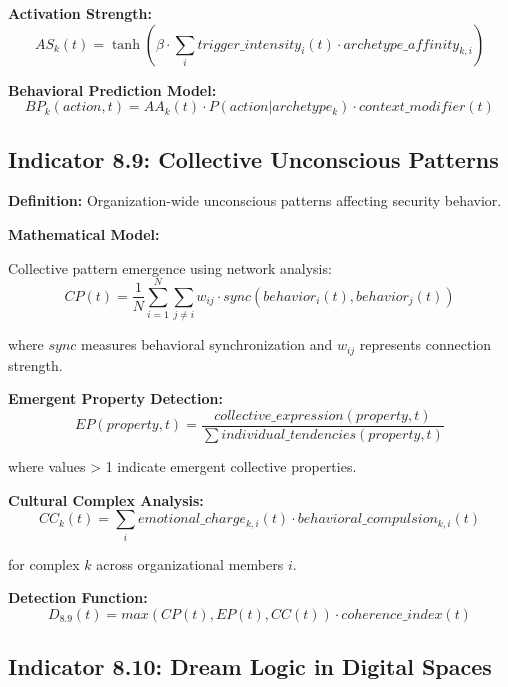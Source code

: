 \documentclass[11pt,a4paper]{article}
\begin{document}
\textbf{Activation Strength:}
\begin{equation}
AS_k(t) = \tanh(\beta \cdot \sum_{i} trigger\_intensity_i(t) \cdot archetype\_affinity_{k,i})
\end{equation}

\textbf{Behavioral Prediction Model:}
\begin{equation}
BP_k(action,t) = AA_k(t) \cdot P(action|archetype_k) \cdot context\_modifier(t)
\end{equation}

\subsection{Indicator 8.9: Collective Unconscious Patterns}

\textbf{Definition:} Organization-wide unconscious patterns affecting security behavior.

\textbf{Mathematical Model:}

Collective pattern emergence using network analysis:
\begin{equation}
CP(t) = \frac{1}{N} \sum_{i=1}^{N} \sum_{j \neq i} w_{ij} \cdot sync(behavior_i(t), behavior_j(t))
\end{equation}

where $sync$ measures behavioral synchronization and $w_{ij}$ represents connection strength.

\textbf{Emergent Property Detection:}
\begin{equation}
EP(property,t) = \frac{collective\_expression(property,t)}{\sum individual\_tendencies(property,t)}
\end{equation}

where values > 1 indicate emergent collective properties.

\textbf{Cultural Complex Analysis:}
\begin{equation}
CC_k(t) = \sum_{i} emotional\_charge_{k,i}(t) \cdot behavioral\_compulsion_{k,i}(t)
\end{equation}

for complex $k$ across organizational members $i$.

\textbf{Detection Function:}
\begin{equation}
D_{8.9}(t) = max(CP(t), EP(t), CC(t)) \cdot coherence\_index(t)
\end{equation}

\subsection{Indicator 8.10: Dream Logic in Digital Spaces}
\end{document}
